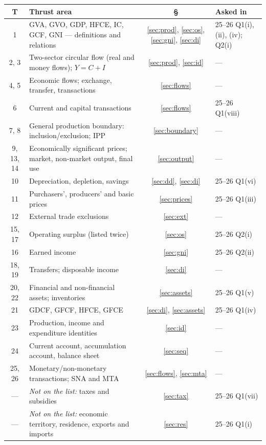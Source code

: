 \documentclass[11pt]{article}
\begin{document}
\begin{center}\small
\begin{tabularx}{\textwidth}{@{}c X c l@{}}
\toprule
\textbf{T} & \textbf{Thrust area} & \textbf{\S} & \textbf{Asked in} \\
\midrule
1 & GVA, GVO, GDP, HFCE, IC, GCF, GNI --- definitions and relations & \ref{sec:prod}, \ref{sec:os}, \ref{sec:gni}, \ref{sec:di} & 25--26 Q1(i), (ii), (iv); Q2(i) \\
2, 3 & Two-sector circular flow (real and money flows); $Y=C+I$ & \ref{sec:prod}, \ref{sec:id} & --- \\
4, 5 & Economic flows; exchange, transfer, transactions & \ref{sec:flows} & --- \\
6 & Current and capital transactions & \ref{sec:flows} & 25--26 Q1(viii) \\
7, 8 & General production boundary: inclusion/exclusion; IPP & \ref{sec:boundary} & --- \\
9, 13, 14 & Economically significant prices; market, non-market output, final use & \ref{sec:output} & --- \\
10 & Depreciation, depletion, savings & \ref{sec:dd}, \ref{sec:di} & 25--26 Q1(vi) \\
11 & Purchasers', producers' and basic prices & \ref{sec:prices} & 25--26 Q1(iii) \\
12 & External trade exclusions & \ref{sec:ext} & --- \\
15, 17 & Operating surplus (listed twice) & \ref{sec:os} & 25--26 Q2(i) \\
16 & Earned income & \ref{sec:gni} & 25--26 Q2(ii) \\
18, 19 & Transfers; disposable income & \ref{sec:di} & --- \\
20, 22 & Financial and non-financial assets; inventories & \ref{sec:assets} & 25--26 Q1(v) \\
21 & GDCF, GFCF, HFCE, GFCE & \ref{sec:di}, \ref{sec:assets} & 25--26 Q1(iv) \\
23 & Production, income and expenditure identities & \ref{sec:id} & --- \\
24 & Current account, accumulation account, balance sheet & \ref{sec:seq} & --- \\
25, 26 & Monetary/non-monetary transactions; SNA and MTA & \ref{sec:flows}, \ref{sec:mta} & --- \\
--- & \textit{Not on the list:} taxes and subsidies & \ref{sec:tax} & 25--26 Q1(vii) \\
--- & \textit{Not on the list:} economic territory, residence, exports and imports & \ref{sec:res} & 25--26 Q1(i) \\
\bottomrule
\end{tabularx}
\end{center}
\end{document}
